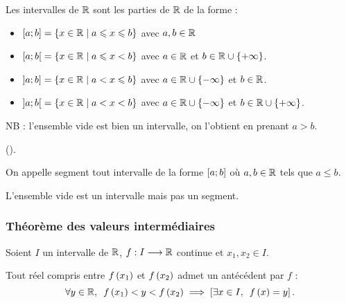 \begin{theo}
Les intervalles de \(\mathbb{R}\) sont les parties de \(\mathbb{R}\) de la forme :

\begin{itemize}
\item \(\left[a;b\right]=\left\lbrace x\in\mathbb{R}\;\middle|\; a\leqslant x\leqslant b\right\rbrace\) avec \(a,b\in\mathbb{R}\) \\

\item \(\left[a;b\right[=\left\lbrace x\in\mathbb{R}\;\middle|\; a\leqslant x<b\right\rbrace\) avec \(a\in\mathbb{R}\) et \(b\in\mathbb{R}\cup\left\lbrace+\infty\right\rbrace\). \\

\item \(\left]a;b\right]=\left\lbrace x\in\mathbb{R}\;\middle|\; a<x\leqslant b\right\rbrace\) avec \(a\in\mathbb{R}\cup\left\lbrace-\infty\right\rbrace\) et \(b\in\mathbb{R}\). \\

\item \(\left]a;b\right[=\left\lbrace x\in\mathbb{R}\;\middle|\; a<x<b\right\rbrace\) avec \(a\in\mathbb{R}\cup\left\lbrace-\infty\right\rbrace\) et \(b\in\mathbb{R}\cup\left\lbrace+\infty\right\rbrace\).
\end{itemize}

NB : l'ensemble vide est bien un intervalle, on l'obtient en prenant \(a>b\).
\end{theo}

\begin{dem}
 (\cf {}).
\end{dem}

\begin{defi}[Segment]
On appelle segment tout intervalle de la forme \(\left[a;b\right]\) où \(a,b\in\mathbb{R}\) tels que \(a\leq b\).
\end{defi}

\begin{rem}
L'ensemble vide est un intervalle mais pas un segment.
\end{rem}

\subsubsection{Théorème des valeurs intermédiaires}

\begin{theo}
Soient \(I\) un intervalle de \(\mathbb{R}\), \(f:I\longrightarrow\mathbb{R}\) continue et \(x_1,x_2\in I\).

Tout réel compris entre \(f\left(x_1\right)\) et \(f\left(x_2\right)\) admet un antécédent par \(f\) : \[\quantifs{\forall y\in\R}f\paren{x_1}<y<f\paren{x_2}\imp\croch{\quantifs{\exists x\in I}f\paren{x}=y}.\]
\end{theo}

